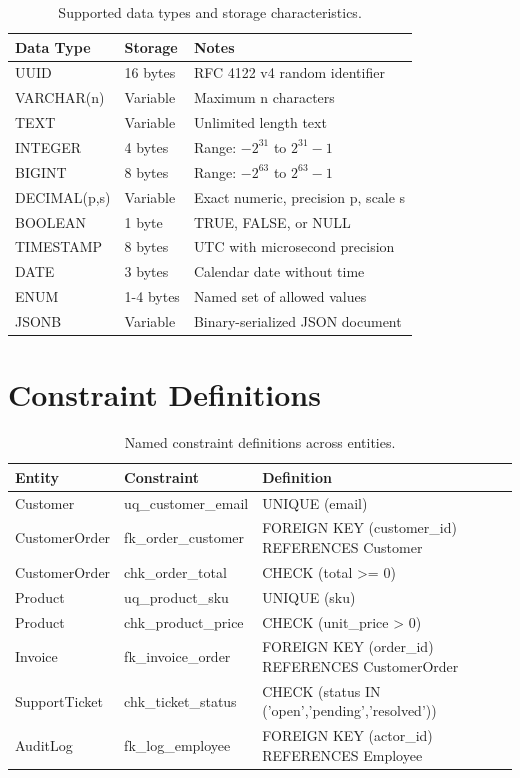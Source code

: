 \documentclass[
    language=english,
    doctype=data-dictionary,
    institution=none,
]{../../omnilatex}
\begin{document}
\begin{table}[h]
    \centering
    \begin{tabular}{llp{5cm}}
        \toprule
        \textbf{Data Type} & \textbf{Storage} & \textbf{Notes} \\
        \midrule
        UUID & 16 bytes & RFC 4122 v4 random identifier \\
        VARCHAR(n) & Variable & Maximum n characters \\
        TEXT & Variable & Unlimited length text \\
        INTEGER & 4 bytes & Range: $-2^{31}$ to $2^{31}-1$ \\
        BIGINT & 8 bytes & Range: $-2^{63}$ to $2^{63}-1$ \\
        DECIMAL(p,s) & Variable & Exact numeric, precision p, scale s \\
        BOOLEAN & 1 byte & TRUE, FALSE, or NULL \\
        TIMESTAMP & 8 bytes & UTC with microsecond precision \\
        DATE & 3 bytes & Calendar date without time \\
        ENUM & 1-4 bytes & Named set of allowed values \\
        JSONB & Variable & Binary-serialized JSON document \\
        \bottomrule
    \end{tabular}
    \caption{Supported data types and storage characteristics.}
\end{table}

\section{Constraint Definitions}

\begin{table}[h]
    \centering
    \begin{tabular}{llp{5cm}}
        \toprule
        \textbf{Entity} & \textbf{Constraint} & \textbf{Definition} \\
        \midrule
        Customer & uq\_customer\_email & UNIQUE (email) \\
        CustomerOrder & fk\_order\_customer & FOREIGN KEY (customer\_id) REFERENCES Customer \\
        CustomerOrder & chk\_order\_total & CHECK (total >= 0) \\
        Product & uq\_product\_sku & UNIQUE (sku) \\
        Product & chk\_product\_price & CHECK (unit\_price > 0) \\
        Invoice & fk\_invoice\_order & FOREIGN KEY (order\_id) REFERENCES CustomerOrder \\
        SupportTicket & chk\_ticket\_status & CHECK (status IN ('open','pending','resolved')) \\
        AuditLog & fk\_log\_employee & FOREIGN KEY (actor\_id) REFERENCES Employee \\
        \bottomrule
    \end{tabular}
    \caption{Named constraint definitions across entities.}
\end{table}
\end{document}
